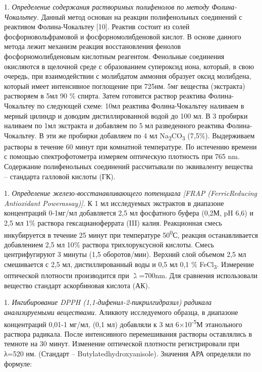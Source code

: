\begin{multicols}{2}
1. \emph{Определение содержания растворимых полифенолов по методу
Фолина-Чокальтеу.} Данный метод основан на реакции полифенольных
соединений с реактивом Фолина-Чокальтеу {[}10{]}. Реактив состоит из
солей фосфорновольфрамовой и фосфорномолибденовой кислот. В основе
данного метода лежит механизм реакция восстановления фенолов
фосфорномолибденовым кислотным реагентом. Фенольные соединения
окисляются в щелочной среде с образованием супероксид иона, который, в
свою очередь, при взаимодействии с молибдатом аммония образует оксид
молибдена, который имеет интенсивное поглощение при 725нм. 5мг
вещества (экстракта) растворяем в 5мл 90 \% спирта. Затем готовится
раствор реактива Фолина-Чокальтеу по следующей схеме: 10мл реактива
Фолина-Чокальтеу наливаем в мерный цилиндр и доводим дистиллированной
водой до 100 мл. В 3 пробирки наливаем по 1мл экстракта и добавляем по
5 мл разведенного реактива Фолина-Чокальтеу. В эти же пробирки
добавляем по 4 мл Na\textsubscript{2}CO\textsubscript{3} (7,5\%).
Выдерживаем растворы в течение 60 минут при комнатной температуре. По
истечению времени с помощью спектрофотометра измеряем оптическую
плотность при 765 nm. Содержание полифенольных соединений рассчитывали
по эквиваленту вещества -- стандарта галловой кислоты (ГК).

1. \emph{Определение железо-восстанавливающего потенциала {[}FRAP
(FerricReducing Antioxidant Powerassay){]}.} К 1 мл исследуемых
экстрактов в диапазоне концентраций 0-1мг/мл добавляется 2,5 мл
фосфатного буфера (0,2М, pH 6,6) и 2,5 мл 1\(\%\) раствора
гексацианоферрата (III) калия. Реакционная смесь инкубируется в
течение 25 минут при температуре 50\textsuperscript{0}С, реакция
останавливается добавлением 2,5 мл 10\(\%\) раствора трихлоруксусной
кислоты. Смесь центрифугируют 3 минуты (1,5 оборотов/мин). Верхний
слой объемом 2,5 мл смешивается с 2,5 мл, дистиллированный воды и 0,5
мл 0,1 \(\%\) FeCl\textsubscript{3}. Измерение оптической плотности
производится при \(\gimel\)=700nm. Для сравнения использовали вещество
стандарт аскорбиновая кислота (АК).

1. \emph{Ингибирование DPPH (1,1-дифенил-2-пикрилгидразил) радикала
анализируемыми веществами.} Аликвоту исследуемого образца, в диапазоне
концентраций 0,01-1 мг/мл, (0,1 мл) добавляли к 3 мл
6×10\textsuperscript{-5}М этанольного раствора радикала. После
интенсивного перемешивания растворы оставлялись в темноте на 30 минут.
Изменение оптической плотности регистрировали при λ=520 нм. (Стандарт
-- Butylatedhydroxyanisole). Значения АРА определяли по формуле:


\end{multicols}
